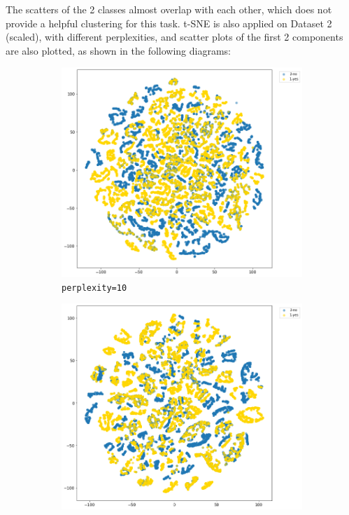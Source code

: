 \documentclass[12pt,twoside,a4paper]{article}
\begin{document}
The scatters of the 2 classes almost overlap with each other, which does not provide a helpful clustering for this task. t-SNE is also applied on Dataset 2 (scaled), with different perplexities, and scatter plots of the first 2 components are also plotted, as shown in the following diagrams:

\begin{figure}
    \centering
    \begin{subfigure}[b]{0.49\linewidth}
        \centering
        \includegraphics[width=\linewidth]{images/tsne-10.png}
        \caption{\texttt{perplexity=10}}
    \end{subfigure}
    \begin{subfigure}[b]{0.49\linewidth}
        \centering
        \includegraphics[width=\linewidth]{images/tsne-20.png}

\end{subfigure}
\end{figure}
\end{document}
